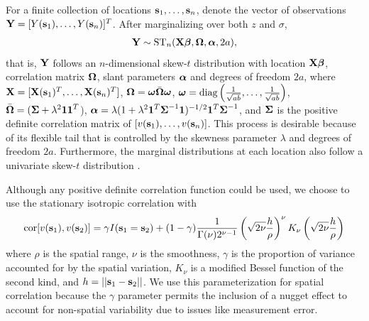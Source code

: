 \documentclass[useAMS,usenatbib,referee]{biom}
\begin{document}
For a finite collection of locations $\mbox{\bf s}_1, \ldots, \mbox{\bf s}_n$, denote the vector of observations $\mbox{\bf Y} = [Y(\mbox{\bf s}_1), \ldots, Y(\mbox{\bf s}_n)]^T$.
After marginalizing over both $z$ and $\sigma$,
\begin{align}
  \bY \sim \text{ST}_n(\bX \bbeta, \bOmega, \balpha, 2a), \label{eq:fullmodel}
\end{align}
that is, $\mbox{\bf Y}$ follows an $n$-dimensional skew-$t$ distribution with location $\mbox{\bf X} \mbox{\boldmath $\beta$}$, correlation matrix $\mbox{\boldmath $\Omega$}$, slant parameters $\mbox{\boldmath $\alpha$}$ and degrees of freedom $2a$, where $\mbox{\bf X} = [\mbox{\bf X}(\mbox{\bf s}_1)^T, \ldots, \mbox{\bf X}(\mbox{\bf s}_n)^T]$, $\mbox{\boldmath $\Omega$} = \mbox{\boldmath $\omega$} \bar{\mbox{\boldmath $\Omega$}} \mbox{\boldmath $\omega$}$, $\mbox{\boldmath $\omega$} = \text{diag}\left(\frac{1}{ \sqrt{ab}}, \ldots, \frac{1}{\sqrt{ab}}\right)$, $\bar{\mbox{\boldmath $\Omega$}} = (\mbox{\boldmath $\Sigma$} + \lambda^2 \mbox{\boldmath $1$} \mbox{\boldmath $1$}^T$), $\mbox{\boldmath $\alpha$} = \lambda (1 + \lambda^2 \mbox{\boldmath $1$}^T \mbox{\boldmath $\Sigma$}^{-1} \mbox{\boldmath $1$})^{-1/2} \mbox{\boldmath $1$}^T \mbox{\boldmath $\Sigma$}^{-1}$, and $\mbox{\boldmath $\Sigma$}$ is the positive definite correlation matrix of $[v(\mbox{\bf s}_1), \ldots, v(\mbox{\bf s}_n)]$.
This process is desirable because of its flexible tail that is controlled by the skewness parameter $\lambda$ and degrees of freedom $2a$.
Furthermore, the marginal distributions at each location also follow a univariate skew-$t$ distribution \citep{Azzalini2014}.

Although any positive definite correlation function could be used, we choose to use the stationary isotropic \Matern correlation with
\begin{align}
  \text{cor}[v(\bs_1), v(\bs_2)] = \gamma I(\bs_1 = \bs_2) + (1 - \gamma)  \frac{ 1 }{ \Gamma(\nu) 2^{ \nu - 1}} \left( \sqrt{2\nu} \frac{ h }{ \rho } \right)^{\nu} K_{\nu} \left( \sqrt{2\nu} \frac{ h }{ \rho } \right) \label{eq:matern}
\end{align}
where $\rho$ is the spatial range, $\nu$ is the smoothness, $\gamma$ is the proportion of variance accounted for by the spatial variation, $K_\nu$ is a modified Bessel function of the second kind, and $h = || \mbox{\bf s}_1 - \mbox{\bf s}_2 ||$.
We use this parameterization for spatial correlation because the $\gamma$ parameter permits the inclusion of a nugget effect to account for non-spatial variability due to issues like measurement error.
\end{document}
